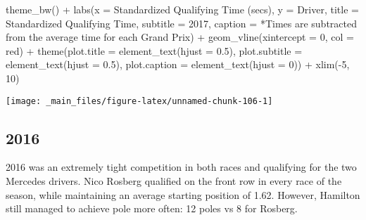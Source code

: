 \documentclass[
]{book}
\newenvironment{Shaded}{\begin{snugshade}}{\end{snugshade}}
\newcommand{\AttributeTok}[1]{\textcolor[rgb]{0.77,0.63,0.00}{#1}}
\newcommand{\DecValTok}[1]{\textcolor[rgb]{0.00,0.00,0.81}{#1}}
\newcommand{\FloatTok}[1]{\textcolor[rgb]{0.00,0.00,0.81}{#1}}
\newcommand{\FunctionTok}[1]{\textcolor[rgb]{0.00,0.00,0.00}{#1}}
\newcommand{\NormalTok}[1]{#1}
\newcommand{\SpecialCharTok}[1]{\textcolor[rgb]{0.00,0.00,0.00}{#1}}
\newcommand{\StringTok}[1]{\textcolor[rgb]{0.31,0.60,0.02}{#1}}
\begin{document}
\begin{Shaded}
\begin{Highlighting}[]
  \FunctionTok{theme\_bw}\NormalTok{() }\SpecialCharTok{+}
  \FunctionTok{labs}\NormalTok{(}\AttributeTok{x =} \StringTok{\textquotesingle{}Standardized Qualifying Time (secs)\textquotesingle{}}\NormalTok{,}
       \AttributeTok{y =} \StringTok{\textquotesingle{}Driver\textquotesingle{}}\NormalTok{,}
       \AttributeTok{title =} \StringTok{\textquotesingle{}Standardized Qualifying Time\textquotesingle{}}\NormalTok{,}
       \AttributeTok{subtitle =} \StringTok{\textquotesingle{}2017\textquotesingle{}}\NormalTok{,}
       \AttributeTok{caption =} \StringTok{\textquotesingle{}*Times are subtracted from the average time for each Grand Prix\textquotesingle{}}\NormalTok{) }\SpecialCharTok{+}
  \FunctionTok{geom\_vline}\NormalTok{(}\AttributeTok{xintercept =} \DecValTok{0}\NormalTok{, }\AttributeTok{col =} \StringTok{\textquotesingle{}red\textquotesingle{}}\NormalTok{) }\SpecialCharTok{+}
  \FunctionTok{theme}\NormalTok{(}\AttributeTok{plot.title =} \FunctionTok{element\_text}\NormalTok{(}\AttributeTok{hjust =} \FloatTok{0.5}\NormalTok{),}
        \AttributeTok{plot.subtitle =} \FunctionTok{element\_text}\NormalTok{(}\AttributeTok{hjust =} \FloatTok{0.5}\NormalTok{),}
        \AttributeTok{plot.caption =} \FunctionTok{element\_text}\NormalTok{(}\AttributeTok{hjust =} \DecValTok{0}\NormalTok{)) }\SpecialCharTok{+}
  \FunctionTok{xlim}\NormalTok{(}\SpecialCharTok{{-}}\DecValTok{5}\NormalTok{, }\DecValTok{10}\NormalTok{)}
\end{Highlighting}
\end{Shaded}

\begin{center}\texttt{[image: \_main\_files/figure-latex/unnamed-chunk-106-1]} \end{center}

\hypertarget{section-7}{%
\subsection{2016}\label{section-7}}

2016 was an extremely tight competition in both races and qualifying for the two Mercedes drivers. Nico Rosberg qualified on the front row in every race of the season, while maintaining an average starting position of 1.62. However, Hamilton still managed to achieve pole more often: 12 poles vs 8 for Rosberg.
\end{document}
